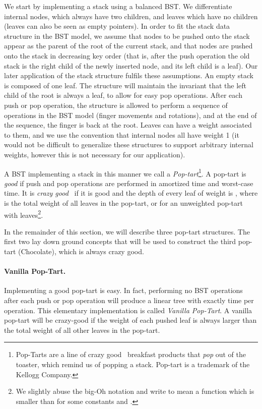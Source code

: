 \documentclass[11pt]{article}
\begin{document}
We start by implementing a stack using a balanced BST. We differentiate
internal nodes, which always have two children, and leaves which have no
children (leaves can also be seen as empty pointers). In order to fit
the stack data structure in the BST model, we assume that nodes to be
pushed onto the stack appear as the parent of the root of the current
stack, and that nodes are pushed onto the stack in decreasing key order
(that is, after the push operation the old stack is the right child of
the newly inserted node, and its left child is a leaf). Our later
application of the stack structure fulfils these assumptions. An empty
stack is composed of one leaf.  The structure will maintain the
invariant that the left child of the root is always a leaf, to allow for
easy pop operations. After each push or pop operation, the structure is
allowed to perform a sequence of operations in the BST model (finger
movements and rotations), and at the end of the sequence, the finger is
back at the root. Leaves can have a weight associated to them, and we
use the convention that internal nodes all have weight 1 (it would not
be difficult to generalize these structures to support arbitrary
internal weights, however this is not necessary for our application).

A BST implementing a stack in this manner we call a
\emph{Pop-tart}\footnote{Pop-Tarts are a line of crazy good~\cite{crazygood} breakfast products that {\em pop} out of the toaster, which remind us of popping a stack. Pop-tart is a trademark of the Kellogg
Company.}. A pop-tart is \emph{good} if push and pop operations are
performed in  amortized time and  worst-case time.  It
is \emph{crazy good}~\cite{crazygood} if it is good and the depth of every leaf of weight
 is , where  is the
total weight of all leaves in the pop-tart, or  for an
unweighted pop-tart with  leaves\footnote{We slightly abuse the big-Oh notation and write
 to mean a function which is smaller than 
for some constants  and .}.

In the remainder of this section, we will describe three pop-tart
structures. The first two lay down ground concepts that will be used to
construct the third pop-tart (Chocolate), which is always crazy good.

\paragraph{Vanilla Pop-Tart.}
Implementing a good pop-tart is easy. In fact, performing no BST
operations after each push or pop operation will produce a linear tree
with exactly  time per operation. This elementary implementation
is called \emph{Vanilla Pop-Tart}.  A vanilla pop-tart will be
crazy-good if the weight of each pushed leaf is always larger than the
total weight of all other leaves in the pop-tart.
\end{document}
